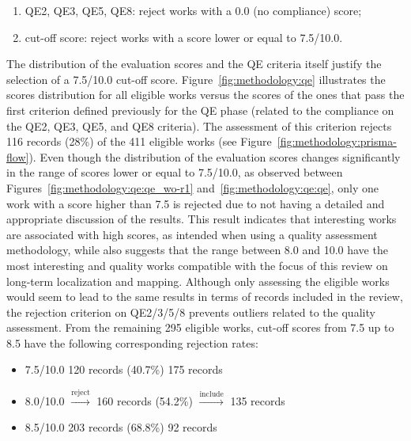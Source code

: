 \begin{enumerate}\setlength\itemsep{-0.5em}
\item QE2, QE3, QE5, QE8: reject works with a 0.0 (no compliance) score;
\item cut-off score: reject works with a score lower or equal to 7.5/10.0.
\end{enumerate}

The distribution of the evaluation scores and the QE criteria itself justify the selection of a 7.5/10.0 cut-off score. 
Figure~\ref{fig:methodology:qe} illustrates the scores distribution for all eligible works versus the scores of the ones that pass the first criterion defined previously for the QE phase (related to the compliance on the QE2, QE3, QE5, and QE8 criteria). The assessment of this criterion rejects 116 records (28\%) of the 411 eligible works (see Figure~\ref{fig:methodology:prisma-flow}). 
Even though the distribution of the evaluation scores changes significantly in the range of scores lower or equal to 7.5/10.0, as observed between Figures~\ref{fig:methodology:qe:qe_wo-r1} and~\ref{fig:methodology:qe:qe}, only one work with a score higher than 7.5 is rejected due to not having a detailed and appropriate discussion of the results. This result indicates that interesting works are associated with high scores, as intended when using a quality assessment methodology, while also suggests that the range between 8.0 and 10.0 have the most interesting and quality works compatible with the focus of this review on long-term localization and mapping. Although only assessing the eligible works would seem to lead to the same results in terms of records included in the review, the rejection criterion on QE2/3/5/8 prevents outliers related to the quality assessment.
From the remaining 295 eligible works, cut-off scores from 7.5 up to 8.5 have the following corresponding rejection rates:

\begin{itemize}[nosep]
\item 7.5/10.0  120 records (40.7\%)  175 records
\item 8.0/10.0 $\xrightarrow{\text{reject}}$ 160 records (54.2\%) $\xrightarrow{\text{include}}$ 135 records
\item 8.5/10.0  203 records (68.8\%)  92 records
\end{itemize}

